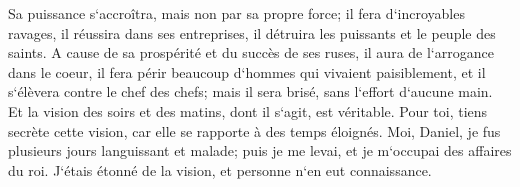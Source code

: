 \verse Sa puissance s`accroîtra, mais non par sa propre force; il fera d`incroyables ravages, il réussira dans ses entreprises, il détruira les puissants et le peuple des saints. 
\verse A cause de sa prospérité et du succès de ses ruses, il aura de l`arrogance dans le coeur, il fera périr beaucoup d`hommes qui vivaient paisiblement, et il s`élèvera contre le chef des chefs; mais il sera brisé, sans l`effort d`aucune main. 
\verse Et la vision des soirs et des matins, dont il s`agit, est véritable. Pour toi, tiens secrète cette vision, car elle se rapporte à des temps éloignés. 
\verse Moi, Daniel, je fus plusieurs jours languissant et malade; puis je me levai, et je m`occupai des affaires du roi. J`étais étonné de la vision, et personne n`en eut connaissance. 

\chapter{}

